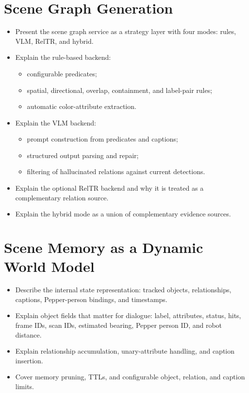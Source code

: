 \documentclass[
  digital,     %
  oneside,     %
  nosansbold,  %
  nocolorbold, %
  lof,         %
  lot,         %
]{fithesis4}
\begin{document}
\section{Scene Graph Generation}
\begin{itemize}
    \item Present the scene graph service as a strategy layer with four modes: rules, VLM, RelTR, and hybrid.
    \item Explain the rule-based backend:
    \begin{itemize}
        \item configurable predicates;
        \item spatial, directional, overlap, containment, and label-pair rules;
        \item automatic color-attribute extraction.
    \end{itemize}
    \item Explain the VLM backend:
    \begin{itemize}
        \item prompt construction from predicates and captions;
        \item structured output parsing and repair;
        \item filtering of hallucinated relations against current detections.
    \end{itemize}
    \item Explain the optional RelTR backend and why it is treated as a complementary relation source.
    \item Explain the hybrid mode as a union of complementary evidence sources.
\end{itemize}

\section{Scene Memory as a Dynamic World Model}
\begin{itemize}
    \item Describe the internal state representation: tracked objects, relationships, captions, Pepper-person bindings, and timestamps.
    \item Explain object fields that matter for dialogue: label, attributes, status, hits, frame IDs, scan IDs, estimated bearing, Pepper person ID, and robot distance.
    \item Explain relationship accumulation, unary-attribute handling, and caption insertion.
    \item Cover memory pruning, TTLs, and configurable object, relation, and caption limits.
\end{itemize}
\end{document}
